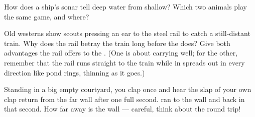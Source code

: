 \begin{exercise}[$\star$]\label{exo:g4:how-sound-travels:9}
How does a ship's sonar tell deep water from shallow? Which two
animals play the same game, and where?
\end{exercise}

\begin{exercise}[$\star\star$]\label{exo:g4:how-sound-travels:10}
Old westerns show scouts pressing an ear to the steel rail to catch
a still-distant train. Why does the rail betray the train long
before the  does? Give both advantages the rail offers to the
. (One is about carrying well; for the other, remember that
the rail runs straight to the train while  in  spreads out
in every direction like pond rings, thinning as it goes.)
\end{exercise}

\begin{exercise}[$\star\star$]\label{exo:g4:how-sound-travels:11}
Standing in a big empty courtyard, you clap once and hear the slap
of your own clap return from the far wall after one full second.
 ran to the wall and back in that second. How far away is the
wall --- careful, think about the round trip!
\end{exercise}
